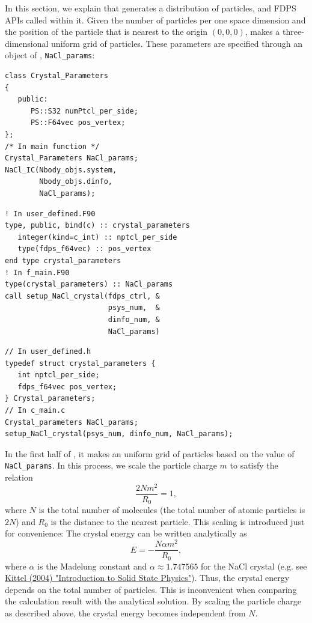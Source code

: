 In this section, we explain \procedure {} that generates a distribution of particles, and FDPS APIs called within it. Given the number of particles per one space dimension and the position of the particle that is nearest to the origin $(0,0,0)$, \procedure {} makes a three-dimensional uniform grid of particles. These parameters are specified through an object of \structure {}, \texttt{NaCl\_params}:
\ifCpp
\begin{lstlisting}
class Crystal_Parameters
{
   public:
      PS::S32 numPtcl_per_side;
      PS::F64vec pos_vertex;
};
/* In main function */
Crystal_Parameters NaCl_params;
NaCl_IC(Nbody_objs.system,
        Nbody_objs.dinfo,
        NaCl_params);
\end{lstlisting}
\endifCpp
\ifFtn
\begin{lstlisting}
! In user_defined.F90
type, public, bind(c) :: crystal_parameters
   integer(kind=c_int) :: nptcl_per_side
   type(fdps_f64vec) :: pos_vertex
end type crystal_parameters
! In f_main.F90
type(crystal_parameters) :: NaCl_params
call setup_NaCl_crystal(fdps_ctrl, &
                        psys_num,  &
                        dinfo_num, &
                        NaCl_params)
\end{lstlisting}
\endifFtn
\ifC
\begin{lstlisting}
// In user_defined.h
typedef struct crystal_parameters {
   int nptcl_per_side;
   fdps_f64vec pos_vertex;
} Crystal_parameters;
// In c_main.c
Crystal_parameters NaCl_params;
setup_NaCl_crystal(psys_num, dinfo_num, NaCl_params);
\end{lstlisting}
\endifC


In the first half of \procedure {}, it makes an uniform grid of particles based on the value of \texttt{NaCl\_params}. In this process, we scale the particle charge $m$ to satisfy the relation
\begin{equation}
\dfrac{2Nm^{2}}{R_{0}}=1,
\end{equation}
where $N$ is the total number of molecules (the total number of atomic particles is $2N$) and $R_{0}$ is the distance to the nearest particle. This scaling is introduced just for convenience: The crystal energy can be written analytically as
\begin{equation}
E = - \dfrac{N\alpha m^{2}}{R_{0}},
\end{equation}
where $\alpha$ is the Madelung constant and $\alpha\approx 1.747565$ for the NaCl crystal (e.g. see \href{http://as.wiley.com/WileyCDA/WileyTitle/productCd-EHEP000803.html}{Kittel (2004) "Introduction to Solid State Physics"}). Thus, the crystal energy depends on the total number of particles. This is inconvenient when comparing the calculation result with the analytical solution. By scaling the particle charge as described above, the crystal energy becomes independent from $N$.

